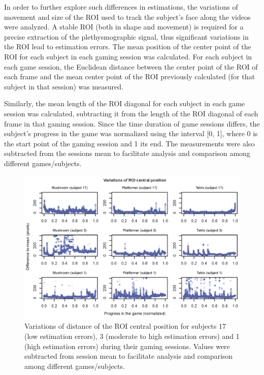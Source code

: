 In order to further explore such differences in estimations, the variations of movement and size of the ROI used to track the subject's face along the videos were analyzed. A stable ROI (both in shape and movement) is required for a precise extraction of the plethysmographic signal, thus significant variations in the ROI lead to estimation errors. The mean position of the center point of the ROI for each subject in each gaming session was calculated. For each subject in each game session, the Euclidean distance between the center point of the ROI of each frame and the mean center point of the ROI previously calculated (for that subject in that session) was measured.

Similarly, the mean length of the ROI diagonal for each subject in each game session was calculated, subtracting it from the length of the ROI diagonal of each frame in that gaming session. Since the time duration of game sessions differs, the subject's progress in the game was normalized using the interval [0, 1], where 0 is the start point of the gaming session and 1 its end. The measurements were also subtracted from the sessions mean to facilitate analysis and comparison among different games/subjects.

\begin{figure}[!h]
\centering
\includegraphics[width=\textwidth]{Content/figures/variation-roi-center.png}
\caption{Variations of distance of the ROI central position for subjects 17 (low estimation errors), 3 (moderate to high estimation errors) and 1 (high estimation errors) during their gaming sessions. Values were subtracted from session mean to facilitate analysis and comparison among different games/subjects.}
\label{fig:chart-roi-anomalies-center}
\end{figure}

